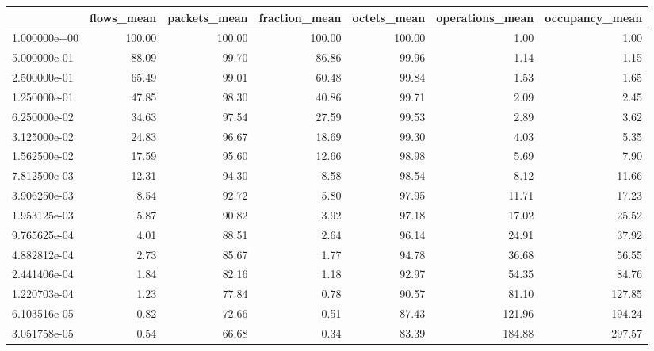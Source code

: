 \begin{tabular}{lrrrrrr}
\toprule
{} &  flows\_mean &  packets\_mean &  fraction\_mean &  octets\_mean &  operations\_mean &  occupancy\_mean \\
\midrule
1.000000e+00 &      100.00 &        100.00 &         100.00 &       100.00 &             1.00 &            1.00 \\
5.000000e-01 &       88.09 &         99.70 &          86.86 &        99.96 &             1.14 &            1.15 \\
2.500000e-01 &       65.49 &         99.01 &          60.48 &        99.84 &             1.53 &            1.65 \\
1.250000e-01 &       47.85 &         98.30 &          40.86 &        99.71 &             2.09 &            2.45 \\
6.250000e-02 &       34.63 &         97.54 &          27.59 &        99.53 &             2.89 &            3.62 \\
3.125000e-02 &       24.83 &         96.67 &          18.69 &        99.30 &             4.03 &            5.35 \\
1.562500e-02 &       17.59 &         95.60 &          12.66 &        98.98 &             5.69 &            7.90 \\
7.812500e-03 &       12.31 &         94.30 &           8.58 &        98.54 &             8.12 &           11.66 \\
3.906250e-03 &        8.54 &         92.72 &           5.80 &        97.95 &            11.71 &           17.23 \\
1.953125e-03 &        5.87 &         90.82 &           3.92 &        97.18 &            17.02 &           25.52 \\
9.765625e-04 &        4.01 &         88.51 &           2.64 &        96.14 &            24.91 &           37.92 \\
4.882812e-04 &        2.73 &         85.67 &           1.77 &        94.78 &            36.68 &           56.55 \\
2.441406e-04 &        1.84 &         82.16 &           1.18 &        92.97 &            54.35 &           84.76 \\
1.220703e-04 &        1.23 &         77.84 &           0.78 &        90.57 &            81.10 &          127.85 \\
6.103516e-05 &        0.82 &         72.66 &           0.51 &        87.43 &           121.96 &          194.24 \\
3.051758e-05 &        0.54 &         66.68 &           0.34 &        83.39 &           184.88 &          297.57 \\

\end{tabular}
